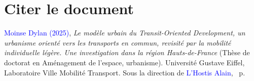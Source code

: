     \cleardoublepage
\section*{Citer le document
    \label{body:citer-document}
    }

\small{\textcolor{blue}{Moinse Dylan (2025)}, \textsl{Le modèle urbain du Transit-Oriented Development, un urbanisme orienté vers les transports en commun, revisité par la mobilité individuelle légère. Une investigation dans la région Hauts-de-France} (Thèse de doctorat en Aménagement de l'espace, urbanisme). Université Gustave Eiffel, Laboratoire Ville Mobilité Transport. Sous la direction de \textcolor{blue}{L'Hostis Alain}, \pageref{LastPage}~p.}